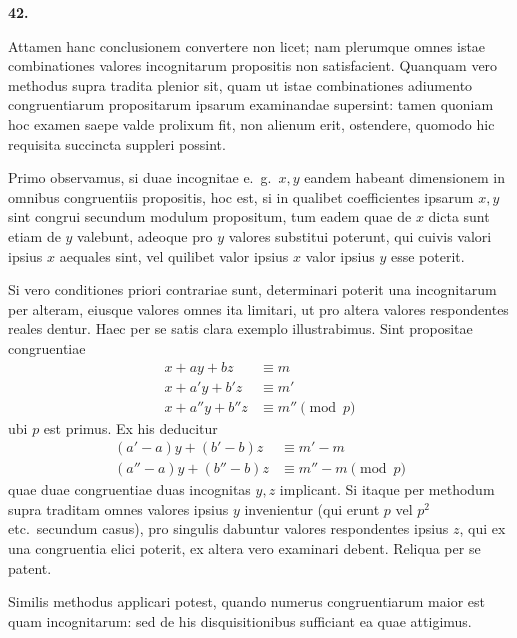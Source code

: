 \documentclass[12pt,a4paper]{article}
\theoremstyle{plain}
\theoremstyle{definition}
\theoremstyle{remark}
\begin{document}
\textbf{42.}

Attamen hanc conclusionem convertere non licet; nam plerumque omnes istae combinationes valores incognitarum propositis non satisfacient. Quanquam vero methodus supra tradita plenior sit, quam ut istae combinationes adiumento congruentiarum propositarum ipsarum examinandae supersint: tamen quoniam hoc examen saepe valde prolixum fit, non alienum erit, ostendere, quomodo hic requisita succincta suppleri possint.

Primo observamus, si duae incognitae e.~g.\ $x, y$ eandem habeant dimensionem in omnibus congruentiis propositis, hoc est, si in qualibet coefficientes ipsarum $x, y$ sint congrui secundum modulum propositum, tum eadem quae de $x$ dicta sunt etiam de $y$ valebunt, adeoque pro $y$ valores substitui poterunt, qui cuivis valori ipsius $x$ aequales sint, vel quilibet valor ipsius $x$ valor ipsius $y$ esse poterit.

Si vero conditiones priori contrariae sunt, determinari poterit una incognitarum per alteram, eiusque valores omnes ita limitari, ut pro altera valores respondentes reales dentur. Haec per se satis clara exemplo illustrabimus. Sint propositae congruentiae
\begin{align*}
x + ay + bz &\equiv m \\
x + a'y + b'z &\equiv m' \\
x + a''y + b''z &\equiv m'' \pmod{p}
\end{align*}
ubi $p$ est primus. Ex his deducitur
\begin{align*}
(a' - a)y + (b' - b)z &\equiv m' - m \\
(a'' - a)y + (b'' - b)z &\equiv m'' - m \pmod{p}
\end{align*}
quae duae congruentiae duas incognitas $y, z$ implicant. Si itaque per methodum supra traditam omnes valores ipsius $y$ invenientur (qui erunt $p$ vel $p^2$ etc.\ secundum casus), pro singulis dabuntur valores respondentes ipsius $z$, qui ex una congruentia elici poterit, ex altera vero examinari debent. Reliqua per se patent.

Similis methodus applicari potest, quando numerus congruentiarum maior est quam incognitarum: sed de his disquisitionibus sufficiant ea quae attigimus.

\clearpage

\tableofcontents
\end{document}
